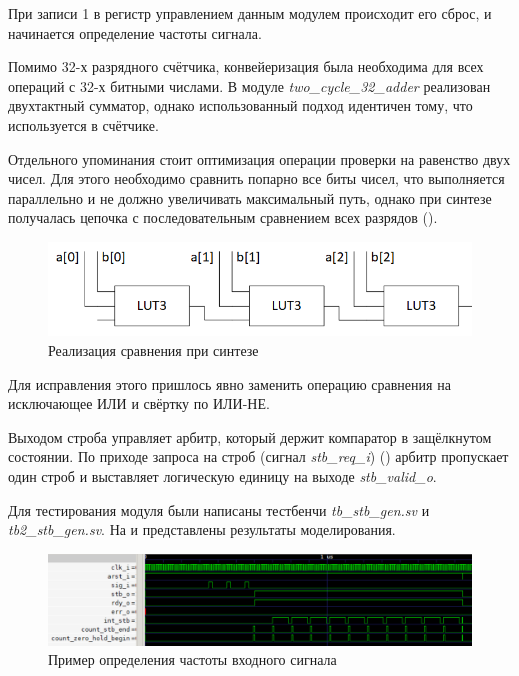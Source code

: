 При записи 1 в регистр управлением данным модулем происходит его сброс, и начинается определение частоты сигнала.

Помимо 32-х разрядного счётчика, конвейеризация была необходима для всех операций с 32-х битными числами. В модуле \emph{two\_cycle\_32\_adder}
реализован двухтактный сумматор, однако использованный подход идентичен тому, что используется в счётчике.

Отдельного упоминания стоит оптимизация операции проверки на равенство двух чисел. Для этого необходимо сравнить попарно все биты
чисел, что выполняется параллельно и не должно увеличивать максимальный путь, однако при синтезе получалась цепочка с последовательным
сравнением всех разрядов ().\\

\begin{figure}[ht!] 
	\center
	\includegraphics [scale=0.7] {my_folder/images//eq}
	\caption{Реализация сравнения при синтезе} 
	\label{fig:eq}  
\end{figure}

\FloatBarrier

Для исправления этого пришлось явно заменить операцию сравнения на исключающее ИЛИ и свёртку по ИЛИ-НЕ.

\lstset{
	numbersep = 5pt,
	stepnumber = 1
}

Выходом строба управляет арбитр, который держит компаратор в защёлкнутом состоянии. По приходе запроса на строб
(сигнал \emph{stb\_req\_i}) () арбитр пропускает один строб и выставляет логическую единицу на выходе
\emph{stb\_valid\_o}.





Для тестирования модуля были написаны тестбенчи \emph{tb\_stb\_gen.sv} и \emph{tb2\_stb\_gen.sv}. На  и 
представлены результаты моделирования.\\

\FloatBarrier

\begin{figure}[ht!] 
	\center
	\includegraphics  [scale=0.7] {my_folder/images//tb_stb_gen}
	\caption{Пример определения частоты входного сигнала} 
	\label{fig:tb-stb-gen}  
\end{figure}

